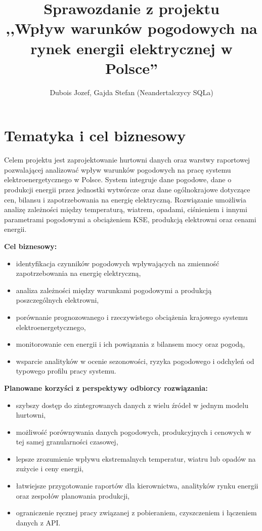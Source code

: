 \documentclass[12pt]{article}
\title{Sprawozdanie z projektu \\ \large,,Wpływ warunków pogodowych na rynek energii elektrycznej w Polsce''}
\author{Dubois Jozef, Gajda Stefan (Neandertalczycy SQLa)}
\date{}
\begin{document}
	\maketitle


	\section{Tematyka i cel biznesowy}

	Celem projektu jest zaprojektowanie hurtowni danych oraz warstwy raportowej pozwalającej analizować wpływ warunków pogodowych na pracę systemu elektroenergetycznego w Polsce. System integruje dane pogodowe, dane o produkcji energii przez jednostki wytwórcze oraz dane ogólnokrajowe dotyczące cen, bilansu i zapotrzebowania na energię elektryczną. Rozwiązanie umożliwia analizę zależności między temperaturą, wiatrem, opadami, ciśnieniem i innymi parametrami pogodowymi a obciążeniem KSE, produkcją elektrowni oraz cenami energii.

	\textbf{Cel biznesowy:}
	\begin{itemize}
		\item identyfikacja czynników pogodowych wpływających na zmienność zapotrzebowania na energię elektryczną,
		\item analiza zależności między warunkami pogodowymi a produkcją poszczególnych elektrowni,
		\item porównanie prognozowanego i rzeczywistego obciążenia krajowego systemu elektroenergetycznego,
		\item monitorowanie cen energii i ich powiązania z bilansem mocy oraz pogodą,
		\item wsparcie analityków w ocenie sezonowości, ryzyka pogodowego i odchyleń od typowego profilu pracy systemu.
	\end{itemize}

	\textbf{Planowane korzyści z perspektywy odbiorcy rozwiązania:}
	\begin{itemize}
		\item szybszy dostęp do zintegrowanych danych z wielu źródeł w jednym modelu hurtowni,
		\item możliwość porównywania danych pogodowych, produkcyjnych i cenowych w tej samej granularności czasowej,
		\item lepsze zrozumienie wpływu ekstremalnych temperatur, wiatru lub opadów na zużycie i ceny energii,
		\item łatwiejsze przygotowanie raportów dla kierownictwa, analityków rynku energii oraz zespołów planowania produkcji,
		\item ograniczenie ręcznej pracy związanej z pobieraniem, czyszczeniem i łączeniem danych z API.
	\end{itemize}
\end{document}
